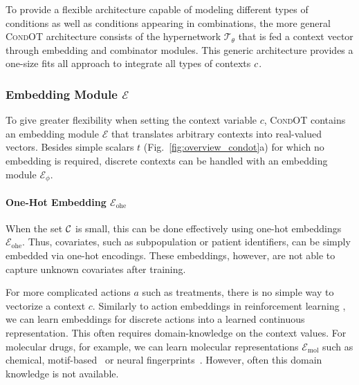 To provide a flexible architecture capable of modeling different types of conditions as well as conditions appearing in combinations, the more general \textsc{CondOT} architecture consists of the hypernetwork $\mathcal{T}_\theta$ that is fed a context vector through embedding and combinator modules. This generic architecture provides a one-size fits all approach to integrate all types of contexts $c$.

\subsubsection{Embedding Module $\mathcal{E}$}
 To give greater flexibility when setting the context variable $c$, \textsc{CondOT} contains an embedding module $\mathcal{E}$ that translates arbitrary contexts into real-valued vectors. Besides simple scalars $t$ (Fig.~\ref{fig:overview_condot}a) for which no embedding is required, discrete contexts can be handled with an embedding module $\mathcal{E}_\phi$.

\paragraph{One-Hot Embedding $\mathcal{E}_\text{ohe}$}
When the set ${\mathcal{C}}$ is small, this can be done effectively using one-hot embeddings $\mathcal{E}_\text{ohe}$.
Thus, covariates, such as subpopulation or patient identifiers, can be simply embedded via one-hot encodings. These embeddings, however, are not able to capture unknown covariates after training.

For more complicated actions $a$ such as treatments, there is no simple way to vectorize a context $c$. Similarly to action embeddings in reinforcement learning \citep{chandak2019learning, tennenholtz2019natural}, we can learn embeddings for discrete actions into a learned continuous representation.
This often requires domain-knowledge on the context values. For molecular drugs, for example, we can learn molecular representations $\mathcal{E}_\text{mol}$ such as chemical, motif-based~\citep{rogers2010extended} or neural fingerprints~\citep{rong2020grover, schwaller2022machine, rogers2010extended}.
However, often this domain knowledge is not available. 

